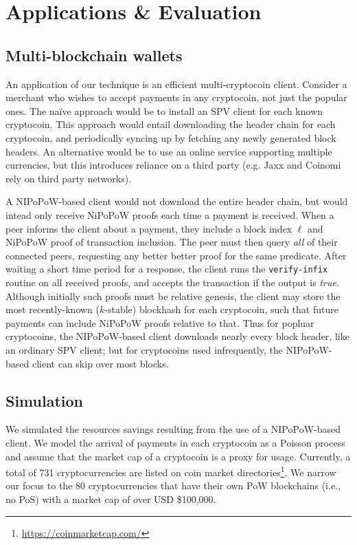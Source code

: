 \section{Applications \& Evaluation}
\label{sec.applications}

\subsection{Multi-blockchain wallets}
\label{sec.multichain}
An application of our technique is an efficient multi-cryptocoin client.
Consider a merchant who wishes to accept payments in any cryptocoin, not just
the popular ones. The na\"ive approach would be to install an SPV client for each known cryptocoin.
This approach would entail downloading the header chain for each cryptocoin, and
periodically syncing up by fetching any newly generated block headers. An
alternative would be to use an online service supporting multiple currencies,
but this introduces reliance on a third party (e.g. Jaxx and Coinomi rely on
third party networks).

A NIPoPoW-based client would not download the entire header chain, but would intead only receive NiPoPoW proofs each time a payment is received. When a peer informs the client about a payment, they include a block index $\ell$ and NiPoPoW proof of transaction inclusion. The peer must then query \emph{all} of their connected peers, requesting any better better proof for the same predicate. After waiting a short time period for a response, the client runs the \texttt{verify-infix} routine on all received proofs, and accepts the transaction if the output is \emph{true}. Although initially such proofs must be relative genesis, the client may store the most recently-known ($k$-stable) blockhash for each cryptocoin, such that future payments can include NiPoPoW proofs relative to that. Thus for popluar cryptocoins, the NIPoPoW-based
client downloads nearly every block header, like an ordinary SPV client; but for
cryptocoins used infrequently, the NIPoPoW-based client can skip over most
blocks.

\subsection{Simulation}
We simulated the resources savings resulting from the use of a NIPoPoW-based
client. We model the arrival of payments in each cryptocoin as a Poisson process
and assume that the market cap of a cryptocoin is a proxy for usage. Currently,
a total of 731 cryptocurrencies are listed on coin market
directories\footnote{\url{https://coinmarketcap.com/}}. We narrow our focus to
the 80 cryptocurrencies that have their own PoW blockchains (i.e., no PoS) with
a market cap of over USD \$100,000.

